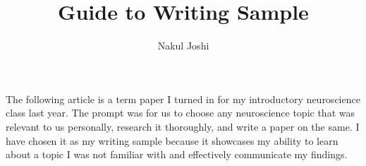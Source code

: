 \documentclass{article}
\title{Guide to Writing Sample}
\author{Nakul Joshi}
\date{}
\begin{document}
\maketitle

The following article is a term paper I turned in for my introductory neuroscience class last year. The prompt was for us to choose any neuroscience topic that was relevant to us personally, research it thoroughly, and write a paper on the same. I have chosen it as my writing sample because it showcases my ability to learn about a topic I was not familiar with and effectively communicate my findings.
\end{document}
